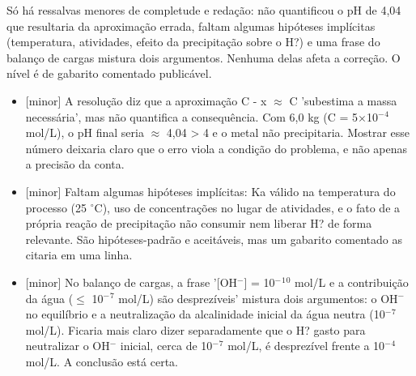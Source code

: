 \documentclass{article}%
\begin{document}
\newline%
Só há ressalvas menores de completude e redação: não quantificou o pH de 4,04 que resultaria da aproximação errada, faltam algumas hipóteses implícitas (temperatura, atividades, efeito da precipitação sobre o H?) e uma frase do balanço de cargas mistura dois argumentos. Nenhuma delas afeta a correção. O nível é de gabarito comentado publicável.%
\begin{itemize}%
\item%
{[}minor{]} A resolução diz que a aproximação C - x $\approx$ C 'subestima a massa necessária', mas não quantifica a consequência. Com 6,0 kg (C = 5$\times$10$^{-}$$^{4}$ mol/L), o pH final seria $\approx$ 4,04 > 4 e o metal não precipitaria. Mostrar esse número deixaria claro que o erro viola a condição do problema, e não apenas a precisão da conta.%
\item%
{[}minor{]} Faltam algumas hipóteses implícitas: Ka válido na temperatura do processo (25 $^\circ$C), uso de concentrações no lugar de atividades, e o fato de a própria reação de precipitação não consumir nem liberar H? de forma relevante. São hipóteses{-}padrão e aceitáveis, mas um gabarito comentado as citaria em uma linha.%
\item%
{[}minor{]} No balanço de cargas, a frase '{[}OH$^{-}${]} = 10$^{-}$$^{1}$$^{0}$ mol/L e a contribuição da água ($\leq$ 10$^{-}$$^{7}$ mol/L) são desprezíveis' mistura dois argumentos: o OH$^{-}$ no equilíbrio e a neutralização da alcalinidade inicial da água neutra (10$^{-}$$^{7}$ mol/L). Ficaria mais claro dizer separadamente que o H? gasto para neutralizar o OH$^{-}$ inicial, cerca de 10$^{-}$$^{7}$ mol/L, é desprezível frente a 10$^{-}$$^{4}$ mol/L. A conclusão está certa.%
\end{itemize}%
\end{document}
